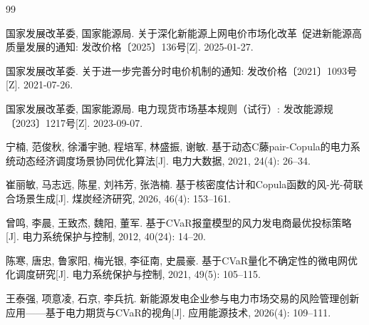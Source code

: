 \begin{thebibliography}{99}
  \footnotesize
  \setlength{\itemsep}{1pt}

  国家发展改革委, 国家能源局.
  关于深化新能源上网电价市场化改革~促进新能源高质量发展的通知:
  发改价格〔2025〕136号[Z]. 2025-01-27.

  国家发展改革委.
  关于进一步完善分时电价机制的通知:
  发改价格〔2021〕1093号[Z]. 2021-07-26.

  国家发展改革委, 国家能源局.
  电力现货市场基本规则（试行）:
  发改能源规〔2023〕1217号[Z]. 2023-09-07.

  宁楠, 范俊秋, 徐潘宇驰, 程培军, 林盛振, 谢敏.
  基于动态C藤pair-Copula的电力系统动态经济调度场景协同优化算法[J].
  电力大数据, 2021, 24(4): 26--34.

  崔丽敏, 马志远, 陈星, 刘祎芳, 张浩楠.
  基于核密度估计和Copula函数的风-光-荷联合场景生成[J].
  煤炭经济研究, 2026, 46(4): 153--161.

  曾鸣, 李晨, 王致杰, 魏阳, 董军.
  基于CVaR报童模型的风力发电商最优投标策略[J].
  电力系统保护与控制, 2012, 40(24): 14--20.

  陈寒, 唐忠, 鲁家阳, 梅光银, 李征南, 史晨豪.
  基于CVaR量化不确定性的微电网优化调度研究[J].
  电力系统保护与控制, 2021, 49(5): 105--115.

  王泰强, 项意凌, 石京, 李兵抗.
  新能源发电企业参与电力市场交易的风险管理创新应用——基于电力期货与CVaR的视角[J].
  应用能源技术, 2026(4): 109--111.


\end{thebibliography}
